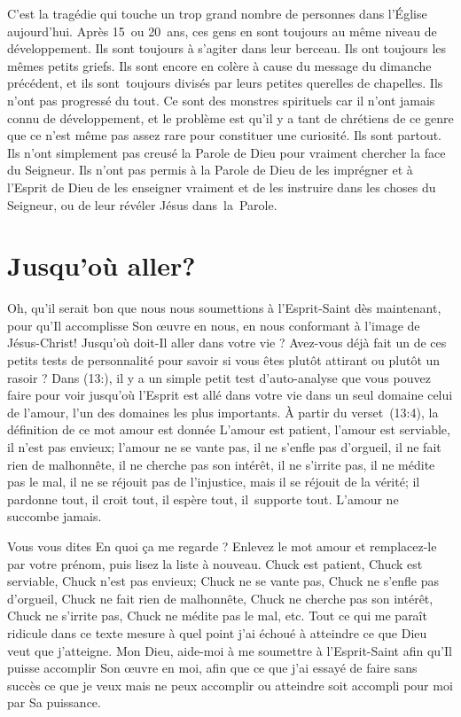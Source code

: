 C'est la tragédie qui touche un trop grand nombre de personnes
 dans l'Église aujourd'hui. Après 15~ou 20~ans,
 ces gens en sont toujours au même niveau de développement.
 Ils sont toujours à s'agiter dans leur berceau.
 Ils ont toujours les mêmes petits griefs.
 Ils sont encore en colère à cause du message du dimanche précédent,
 et ils sont~toujours divisés par leurs petites querelles de chapelles.
 Ils n'ont pas progressé du tout. Ce sont des monstres spirituels
 car il n'ont jamais connu de développement, et le problème est qu'il y a
 tant de chrétiens de ce genre que ce n'est même pas assez rare pour constituer une curiosité.
 Ils sont partout. Ils n'ont simplement pas creusé la Parole de Dieu
 pour vraiment chercher la face du Seigneur. Ils n'ont pas permis à la Parole de Dieu
 de les imprégner et à l'Esprit de Dieu de les enseigner vraiment et
 de les instruire dans les choses du Seigneur,
 ou de leur révéler Jésus dans~la~Parole.


\section{Jusqu'o\`u aller?}

Oh, qu'il serait bon que nous nous soumettions à l'Esprit-Saint
 dès maintenant, pour qu'Il accomplisse Son œuvre en nous,
 en nous conformant à l'image de Jésus-Christ!
 Jusqu'où doit-Il aller dans votre vie ?
 Avez-vous déjà fait un de ces petits tests de personnalité pour savoir
 si vous êtes plutôt attirant ou plutôt un rasoir ?
 Dans (13:), il y a un simple petit test d'auto-analyse
 que vous pouvez faire pour voir jusqu'où l'Esprit est allé
 dans votre vie dans un seul domaine\frcolon{} celui de l'amour,
 l'un des domaines les plus importants.
 À partir du verset~(13:4), la définition
 de ce mot \Og amour \Fg{} est donnée\frcolon{}
 \Og L'amour est patient, l'amour est serviable, il n'est pas envieux;
 l'amour ne se vante pas, il ne s'enfle pas d'orgueil,
 il ne fait rien de malhonnête, il ne cherche pas son intérêt,
 il ne s'irrite pas, il ne médite pas le mal, il ne se réjouit pas
 de l'injustice, mais il se réjouit de la vérité; il pardonne tout,
 il croit tout, il espère tout, il~supporte tout.
 L'amour ne succombe jamais. \Fg{}

Vous vous dites\frcolon{}
 \Og En quoi ça me regarde ? \Fg{}
 Enlevez le mot \Og amour \Fg{} et remplacez-le par votre prénom,
 puis lisez la liste à nouveau.
 \Og Chuck est patient, Chuck est serviable, Chuck n'est pas envieux;
 Chuck ne se vante pas, Chuck ne s'enfle pas d'orgueil, Chuck ne fait rien
 de malhonnête, Chuck ne cherche pas son intérêt, Chuck ne s'irrite pas,
 Chuck ne médite pas le mal, etc. \Fg{}
 Tout ce qui me paraît ridicule dans ce texte mesure à quel point j'ai échoué
 à atteindre ce que Dieu veut que j'atteigne.
 Mon Dieu, aide-moi à me soumettre à l'Esprit-Saint afin qu'Il puisse accomplir
 Son œuvre en moi, afin que ce que j'ai essayé de faire sans succès
 \ocadr ce que je veux mais ne peux accomplir ou atteindre \fcadr
 soit accompli pour moi par Sa puissance.
\closechapter

